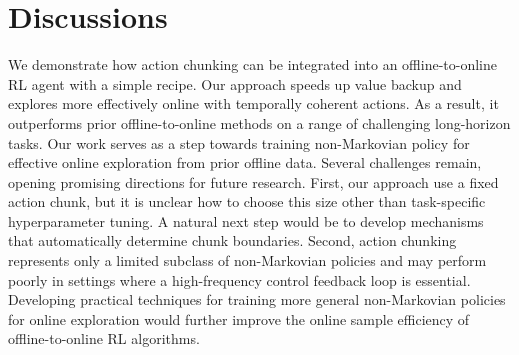\section{Discussions}
\label{sec:discussions}
We demonstrate how action chunking can be integrated into an offline-to-online RL agent with a simple recipe. Our approach speeds up value backup and explores more effectively online with temporally coherent actions. As a result, it outperforms prior offline-to-online methods on a range of challenging long-horizon tasks. Our work serves as a step towards training non-Markovian policy for effective online exploration from prior offline data. Several challenges remain, opening promising directions for future research. First, our approach use a fixed action chunk, but it is unclear how to choose this size other than task-specific hyperparameter tuning. A natural next step would be to develop mechanisms that automatically determine chunk boundaries. Second, action chunking represents only a limited subclass of non-Markovian policies and may perform poorly in settings where a high-frequency control feedback loop is essential. Developing practical techniques for training more general non-Markovian policies for online exploration would further improve the online sample efficiency of offline-to-online RL algorithms.



